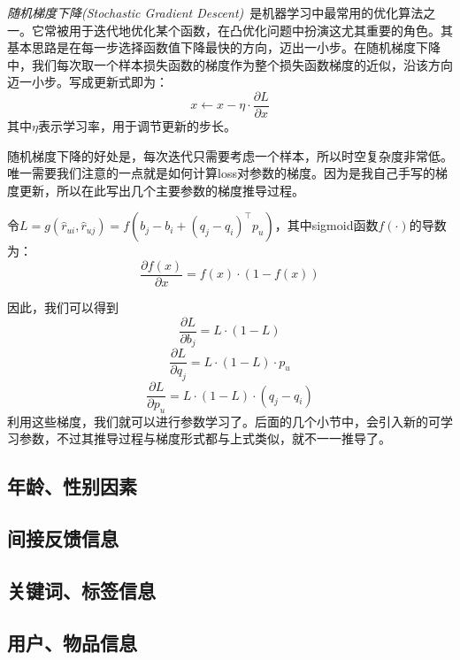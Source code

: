 \documentclass[12pt]{article} %
\newcommand\qq{\boldsymbol{\mathit{q}}}
\newcommand\pp{\boldsymbol{\mathit{p}}}
\begin{document}
\begin{sloppypar}
{\em 随机梯度下降(Stochastic Gradient Descent)}~\cite{robbins1951stochastic}是机器学习中最常用的优化算法之一。它常被用于迭代地优化某个函数，在凸优化问题中扮演这尤其重要的角色。其基本思路是在每一步选择函数值下降最快的方向，迈出一小步。在随机梯度下降中，我们每次取一个样本损失函数的梯度作为整个损失函数梯度的近似，沿该方向迈一小步。写成更新式即为：
\begin{equation}
	x \leftarrow x - \eta \cdot \frac{\partial L}{\partial x}
\end{equation}
其中$\eta$表示学习率，用于调节更新的步长。

随机梯度下降的好处是，每次迭代只需要考虑一个样本，所以时空复杂度非常低。唯一需要我们注意的一点就是如何计算loss对参数的梯度。因为是我自己手写的梯度更新，所以在此写出几个主要参数的梯度推导过程。

令$L = g(\hat{r}_{ui}, \hat{r}_{uj}) = f(b_j - b_i + (\qq_j - \qq_i)^\top \pp_u)$，其中sigmoid函数$f(\cdot)$的导数为：
\begin{equation}
\frac{\partial f(x)}{\partial x} = f(x) \cdot (1 - f(x))
\end{equation}

因此，我们可以得到
\begin{equation}
\frac{\partial L}{\partial b_j} = L \cdot (1 - L)
\end{equation}
\begin{equation}
\frac{\partial L}{\partial \qq_j} = L \cdot (1 - L) \cdot \pp_u
\end{equation}
\begin{equation}
\frac{\partial L}{\partial \pp_u} = L \cdot (1 - L) \cdot \left(\qq_j - \qq_i\right)
\end{equation}
利用这些梯度，我们就可以进行参数学习了。后面的几个小节中，会引入新的可学习参数，不过其推导过程与梯度形式都与上式类似，就不一一推导了。


\subsection{年龄、性别因素}

\subsection{间接反馈信息}

\subsection{关键词、标签信息}

\subsection{用户、物品信息}



\end{sloppypar}
\end{document}
